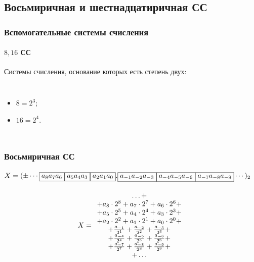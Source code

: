     
\subsection{Восьмиричная и шестнадцатиричная СС}

\begin{frame}
    \frametitle{Вспомогательные системы счисления}
    \framesubtitle{$8,16$ СС}
    
    Системы счисления, основание которых есть степень двух: 
    \begin{columns}
        \begin{itemize}
            \item $8=2^3$;
            \item $16=2^4$.
        \end{itemize}
    \end{columns}
\end{frame}

\begin{frame}
    \frametitle{Восьмиричная СС}
    \framesubtitle{
        \(
        X=(\pm\cdots\fbox{$a_8a_7a_6$}\fbox{$a_5a_4a_3$}\fbox{$a_2a_1a_0$}.
        \fbox{$a_{-1}a_{-2}a_{-3}$}\fbox{$a_{-4}a_{-5}a_{-6}$}\fbox{$a_{-7}a_{-8}a_{-9}$}\cdots)_2
        \)
    }
    
    \[
        X=
            \begin{array}[c]{c}
                \ldots+\\+
                a_{8}\cdot 2^{8} +
                a_{7}\cdot 2^{7} +
                a_{6}\cdot 2^{6} +\\+

                a_{5}\cdot 2^{5} +
                a_{4}\cdot 2^{4} +
                a_{3}\cdot 2^{3} +\\+

                a_{2}\cdot 2^{2} +
                a_{1}\cdot 2^{1} +
                a_{0}\cdot 2^{0} +\\+

                \frac {a_{-1}}{2^{1}} +
                \frac {a_{-2}}{2^{2}} +
                \frac {a_{-3}}{2^{3}} +\\+

                \frac {a_{-4}}{2^{4}} +
                \frac {a_{-5}}{2^{5}} +
                \frac {a_{-6}}{2^{6}} +\\+

                \frac {a_{-7}}{2^{7}} +
                \frac {a_{-8}}{2^{8}} +
                \frac {a_{-9}}{2^{9}} +\\

                +\ldots
        \end{array}
    \]
\end{frame}

